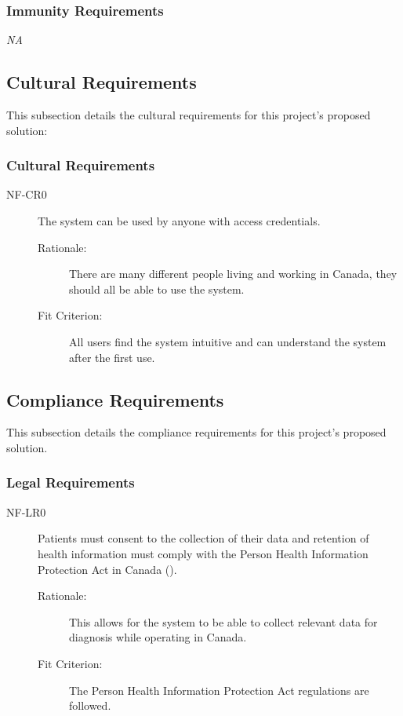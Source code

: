 \documentclass[12pt]{article}
\begin{document}
\subsubsection{Immunity Requirements}
\textit{NA}


\subsection{Cultural Requirements}
This subsection details the cultural requirements for this project's proposed solution:

\subsubsection{Cultural Requirements}
\begin{description}
    \item[NF-CR0] The system can be used by anyone with access credentials.
        \begin{description}
        \item[Rationale:] There are many different people living and working in Canada, they should all be able to use the system. 
        \item[Fit Criterion:] All users find the system intuitive and can understand the system after the first use. 
    \end{description}
\end{description}

\subsection{Compliance Requirements}
This subsection details the compliance requirements for this project's proposed solution.

\subsubsection{Legal Requirements}
\begin{description}
    \item[NF-LR0] Patients must consent to the collection of their data and retention of health information must comply with the Person Health Information Protection Act in Canada (\cite{PHIPA}). 
        \begin{description}
        \item[Rationale:] This allows for the system to be able to collect relevant data for diagnosis while operating in Canada. 
        \item[Fit Criterion:] The Person Health Information Protection Act regulations are followed. 
    \end{description}
\end{description}
\end{document}
